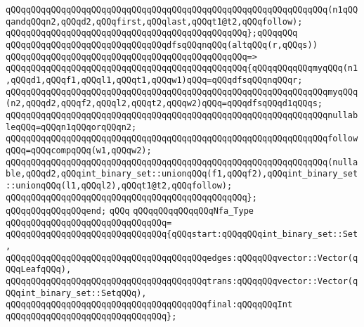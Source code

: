 \newline
\verb|qQQqqQQqqQQqqQQqqQQqqQQqqQQqqQQqqQQqqQQqqQQqqQQqqQQqqQQqqQQqqQQq(n1qQQqandqQQqn2,qQQqd2,qQQqfirst,qQQqlast,qQQqt1@t2,qQQqfollow);|\newline
\verb|qQQqqQQqqQQqqQQqqQQqqQQqqQQqqQQqqQQqqQQqqQQqqQQq};qQQqqQQq|\newline
\newline
\verb|qQQqqQQqqQQqqQQqqQQqqQQqqQQqqQQqdfsqQQqnqQQq(altqQQq(r,qQQqs))|\newline
\verb|qQQqqQQqqQQqqQQqqQQqqQQqqQQqqQQqqQQqqQQqqQQqqQQq=>|\newline
\verb|qQQqqQQqqQQqqQQqqQQqqQQqqQQqqQQqqQQqqQQqqQQqqQQq{qQQqqQQqqQQqmyqQQq(n1,qQQqd1,qQQqf1,qQQql1,qQQqt1,qQQqw1)qQQq=qQQqdfsqQQqnqQQqr;|\newline
\verb|qQQqqQQqqQQqqQQqqQQqqQQqqQQqqQQqqQQqqQQqqQQqqQQqqQQqqQQqqQQqqQQqmyqQQq(n2,qQQqd2,qQQqf2,qQQql2,qQQqt2,qQQqw2)qQQq=qQQqdfsqQQqd1qQQqs;|\newline
\newline
\verb|qQQqqQQqqQQqqQQqqQQqqQQqqQQqqQQqqQQqqQQqqQQqqQQqqQQqqQQqqQQqqQQqnullableqQQq=qQQqn1qQQqorqQQqn2;|\newline
\verb|qQQqqQQqqQQqqQQqqQQqqQQqqQQqqQQqqQQqqQQqqQQqqQQqqQQqqQQqqQQqqQQqfollowqQQq=qQQqcompqQQq(w1,qQQqw2);|\newline
\newline
\verb|qQQqqQQqqQQqqQQqqQQqqQQqqQQqqQQqqQQqqQQqqQQqqQQqqQQqqQQqqQQqqQQq(nullable,qQQqd2,qQQqint_binary_set::unionqQQq(f1,qQQqf2),qQQqint_binary_set::unionqQQq(l1,qQQql2),qQQqt1@t2,qQQqfollow);|\newline
\verb|qQQqqQQqqQQqqQQqqQQqqQQqqQQqqQQqqQQqqQQqqQQqqQQq};|\newline
\verb|qQQqqQQqqQQqqQQqend;|\newline
\verb|qQQq|\newline
\verb|qQQqqQQqqQQqqQQqNfa_Type|\newline
\verb|qQQqqQQqqQQqqQQqqQQqqQQqqQQqqQQq=|\newline
\verb|qQQqqQQqqQQqqQQqqQQqqQQqqQQqqQQq{qQQqstart:qQQqqQQqint_binary_set::Set,|\newline
\verb|qQQqqQQqqQQqqQQqqQQqqQQqqQQqqQQqqQQqqQQqedges:qQQqqQQqvector::Vector(qQQqLeafqQQq),|\newline
\verb|qQQqqQQqqQQqqQQqqQQqqQQqqQQqqQQqqQQqqQQqtrans:qQQqqQQqvector::Vector(qQQqint_binary_set::SetqQQq),|\newline
\verb|qQQqqQQqqQQqqQQqqQQqqQQqqQQqqQQqqQQqqQQqfinal:qQQqqQQqInt|\newline
\verb|qQQqqQQqqQQqqQQqqQQqqQQqqQQqqQQq};|\newline
